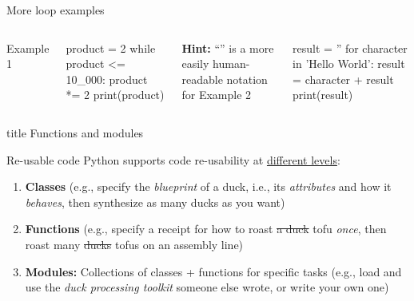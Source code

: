 \documentclass[aspectratio=169]{beamer}
\newcommand\makesectionframe[1]{%
    \begin{frame}[noframenumbering]{}%
        \begin{beamercolorbox}{title}%
        \centering\usebeamerfont{title} #1%
        \end{beamercolorbox}%
    \end{frame}}
\begin{document}
\begin{frame}[fragile]{More loop examples}
\begin{columns}[T]
\alert{Example 1}
\begin{python}
product = 2
while product <= 10_000:
    product *= 2
print(product)
\end{python}
\textbf{Hint:} ``'' is a more easily human-readable notation for 
\alert{Example 2}
\begin{python}
result = ''
for character in 'Hello World':
    result = character + result
print(result)
\end{python}
\end{columns}
\end{frame}


\makesectionframe{Functions and modules}


{\begin{frame}{Re-usable code}
    Python supports \alert{code re-usability} at \underline{different levels}:
    \begin{enumerate}
        \item<1> \textbf{Classes} (e.g., specify the \emph{blueprint} of a duck, i.e., its \emph{attributes} and how it \emph{behaves}, then synthesize as many ducks as you want)
        \item<1-2> \textbf{Functions} (e.g., specify a receipt for how to roast \st{a duck} tofu \emph{once}, then roast many \st{ducks} tofus on an assembly line)
        \item<1-2> \textbf{Modules:} Collections of classes + functions for specific tasks (e.g., load and use the \emph{duck processing toolkit} someone else wrote, or write your own one)
    \end{enumerate}
\end{frame}}
\end{document}
